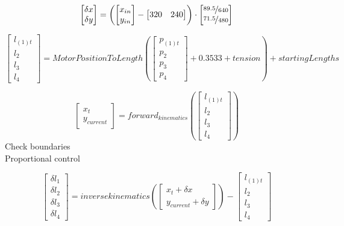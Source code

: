 \documentclass{article}
\begin{document}
  \[
\begin{bmatrix}
	\delta{x}\\
\delta{y}
\end{bmatrix}
=
\left(
\begin{bmatrix}
x_{in}\\
y_{in}
\end{bmatrix}
-
\begin{bmatrix}
320 & 240
\end{bmatrix}
\right)
\cdot
\begin{bmatrix}
\nicefrac{89.5}{640}\\
\nicefrac{71.5}{480}
\end{bmatrix}
\]


\[
\begin{bmatrix}
l_{(1)t}\\
l_2\\
l_3\\
l_4
\end{bmatrix}
=MotorPositionToLength\left(
\begin{bmatrix}
p_{(1)t}\\
p_2\\
p_3\\
p_4
\end{bmatrix}
+ 0.3533 + tension
\right)
+ startingLengths
\]

\[
\begin{bmatrix}
x_{t}\\
y_{current}
\end{bmatrix}
= forward_{kinematics} \left(
\begin{bmatrix}
l_{(1)t}\\
l_2\\
l_3\\
l_4
\end{bmatrix}
\right)
\]
Check boundaries\\
Proportional control

\[
\begin{bmatrix}
\delta{l_1}\\
\delta{l_2}\\
\delta{l_3}\\
\delta{l_4}
\end{bmatrix}
= inverse{kinematics}\left(
\begin{bmatrix}
x_{t} + \delta{x}\\
y_{current} + \delta{y}
\end{bmatrix}
\right)
-
\begin{bmatrix}
l_{(1)t}\\
l_2\\
l_3\\
l_4
\end{bmatrix}
\]
\end{document}
